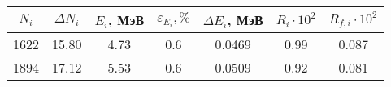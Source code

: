 \begin{tabular}{ccccccc}
\toprule
$N_i$ & $\Delta N_i$ & $E_i$, МэВ & $\varepsilon_{E_i}, \%$ & $\Delta E_i$, МэВ & $R_i \cdot 10^2$ & $R_{f,i} \cdot 10^2$ \\
\midrule
1622 & 15.80 & 4.73 & 0.6 & 0.0469 & 0.99 & 0.087 \\
1894 & 17.12 & 5.53 & 0.6 & 0.0509 & 0.92 & 0.081 \\
\bottomrule
\end{tabular}
